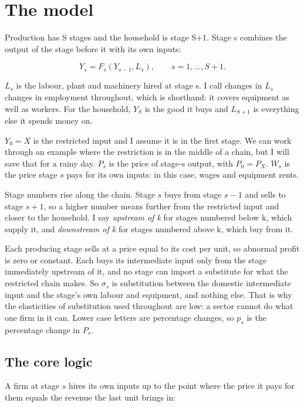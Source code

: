\documentclass[11pt,a4paper]{article}
\begin{document}
\section{The model}
\label{sec:model}

Production has S stages and the household is stage S+1. Stage s combines the output of the stage before it with its own inputs:

\begin{equation}
Y_s = F_s(Y_{s-1}, L_s), \qquad s = 1, \dots, S+1 .
\end{equation}

$L_s$ is the labour, plant and machinery hired at stage s. I call changes in $L_s$ changes in employment throughout, which is shorthand: it covers equipment as well as workers. For the household, $Y_S$ is the good it buys and $L_{S+1}$ is everything else it spends money on.

$Y_0 = X$ is the restricted input and I assume it is in the first stage. We can work through an example where the restriction is in the middle of a chain, but I will save that for a rainy day. $P_s$ is the price of stage-s output, with $P_0 = P_X$. $W_s$ is the price stage $s$ pays for its own inputs: in this case, wages and equipment rents.

Stage numbers rise along the chain. Stage $s$ buys from stage $s-1$ and sells to stage $s+1$, so a higher number means further from the restricted input and closer to the household. I say \emph{upstream of k} for stages numbered below k, which supply it, and \emph{downstream of k} for stages numbered above k, which buy from it.

Each producing stage sells at a price equal to its cost per unit, so abnormal profit is zero or constant. Each buys its intermediate input only from the stage immediately upstream of it, and no stage can import a substitute for what the restricted chain makes. So $\sigma_s$ is substitution between the domestic intermediate input and the stage's own labour and equipment, and nothing else. That is why the elasticities of substitution used throughout are low: a sector cannot do what one firm in it can. Lower case letters are percentage changes, so $p_s$ is the percentage change in $P_s$.

\subsection{The core logic}
\label{sec:core}

A firm at stage $s$ hires its own inputs up to the point where the price it pays for them equals the revenue the last unit brings in:
\end{document}
